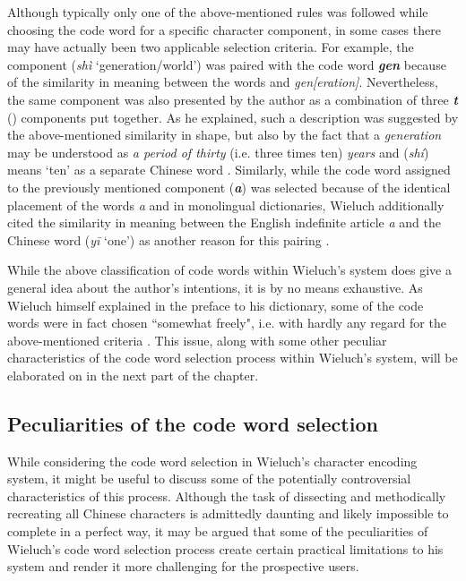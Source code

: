\documentclass[output=paper,colorlinks,citecolor=brown,arabicfont,chinesefont]{langscibook}
\begin{document}
Although typically only one of the above-mentioned rules was followed while choosing the code word for a specific character component, in some cases there may have actually been two applicable selection criteria. For example, the component {} (\emph{shì} ‘generation/world’) was paired with the code word \textbf{\emph{gen}} because of the similarity in meaning between the words {} and \emph{gen[eration]}. Nevertheless, the same component was also presented by the author as a combination of three \textbf{\emph{t}} ({}) components put together. As he explained, such a description was suggested by the above-mentioned similarity in shape, but also by the fact that a \emph{generation} may be understood as \emph{a period of thirty} (i.e. three times ten) \emph{years} and {} (\emph{shí}) means ‘ten’ as a separate Chinese word \citep[5\textsubscript{p}]{Wieluch1936}. Similarly, while the code word assigned to the previously mentioned component {} (\textbf{\emph{a}}) was selected because of the identical placement of the words \emph{a} and {} in monolingual dictionaries, Wieluch additionally cited the similarity in meaning between the English indefinite article \emph{a} and the Chinese word {} (\emph{yī} ‘one’) as another reason for this pairing \citep[4\textsubscript{p}]{Wieluch1936}.

While the above classification of code words within Wieluch's system does give a general idea about the author's intentions, it is by no means exhaustive. As Wieluch himself explained in the preface to his dictionary, some of the code words were in fact chosen “somewhat freely", i.e. with hardly any regard for the above-mentioned criteria \citep[9\textsubscript{p}]{Wieluch1936}. This issue, along with some other peculiar characteristics of the code word selection process within Wieluch's system, will be elaborated on in the next part of the chapter.

\subsection{Peculiarities of the code word selection}

While considering the code word selection in Wieluch's character encoding system, it might be useful to discuss some of the potentially controversial characteristics of this process. Although the task of dissecting and methodically recreating all Chinese characters is admittedly daunting and likely impossible to complete in a perfect way, it may be argued that some of the peculiarities of Wieluch's code word selection process create certain practical limitations to his system and render it more challenging for the prospective users.
\end{document}
